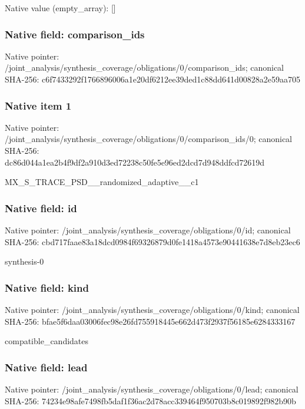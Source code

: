 \documentclass[10pt,a4paper]{article}
\begin{document}
Native value (empty\_\allowbreak{}array): []

\subsubsection{Native field: comparison\_\allowbreak{}ids}
Native pointer: /joint\_\allowbreak{}analysis/synthesis\_\allowbreak{}coverage/obligations/0/comparison\_\allowbreak{}ids; canonical SHA-256: c6f7433292f1766896006a1e20df6212ee39ded1c88dd641d00828a2e59aa705

\subsubsection{Native item 1}
Native pointer: /joint\_\allowbreak{}analysis/synthesis\_\allowbreak{}coverage/obligations/0/comparison\_\allowbreak{}ids/0; canonical SHA-256: dc86d044a1ea2b4f9df2a910d3ed72238c50fe5e96ed2dcd7d948ddfcd72619d

\begingroup\raggedright\sloppy MX\_\allowbreak{}S\_\allowbreak{}TRACE\_\allowbreak{}PSD\_\allowbreak{}\_\allowbreak{}randomized\_\allowbreak{}adaptive\_\allowbreak{}\_\allowbreak{}c1\par\endgroup

\subsubsection{Native field: id}
Native pointer: /joint\_\allowbreak{}analysis/synthesis\_\allowbreak{}coverage/obligations/0/id; canonical SHA-256: cbd717faae83a18dcd0984f69326879d0fe1418a4573e90441638e7d8eb23ec6

\begingroup\raggedright\sloppy synthesis-0\par\endgroup

\subsubsection{Native field: kind}
Native pointer: /joint\_\allowbreak{}analysis/synthesis\_\allowbreak{}coverage/obligations/0/kind; canonical SHA-256: bfae5f6daa03006fec98e26fd755918445e662d473f2937f56185e6284333167

\begingroup\raggedright\sloppy compatible\_\allowbreak{}candidates\par\endgroup

\subsubsection{Native field: lead}
Native pointer: /joint\_\allowbreak{}analysis/synthesis\_\allowbreak{}coverage/obligations/0/lead; canonical SHA-256: 74234e98afe7498fb5daf1f36ac2d78acc339464f950703b8c019892f982b90b
\end{document}
